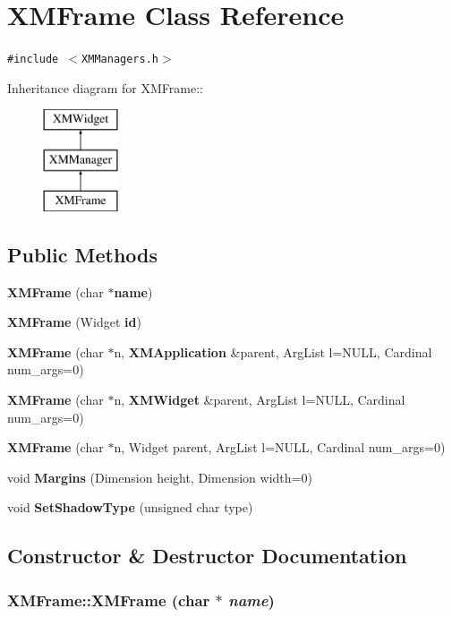 \section{XMFrame  Class Reference}
\label{classXMFrame}
{\tt \#include $<$XMManagers.h$>$}

Inheritance diagram for XMFrame::\begin{figure}[H]
\begin{center}
\leavevmode
\includegraphics[height=3cm]{classXMFrame}
\end{center}
\end{figure}
\subsection*{Public Methods}
\begin{CompactItemize}
\item 
{\bf XMFrame} (char $\ast${\bf name})
\item 
{\bf XMFrame} (Widget {\bf id})
\item 
{\bf XMFrame} (char $\ast$n, {\bf XMApplication} \&parent, Arg\-List l=NULL, Cardinal num\_\-args=0)
\item 
{\bf XMFrame} (char $\ast$n, {\bf XMWidget} \&parent, Arg\-List l=NULL, Cardinal num\_\-args=0)
\item 
{\bf XMFrame} (char $\ast$n, Widget parent, Arg\-List l=NULL, Cardinal num\_\-args=0)
\item 
void {\bf Margins} (Dimension height, Dimension width=0)
\item 
void {\bf Set\-Shadow\-Type} (unsigned char type)
\end{CompactItemize}


\subsection{Constructor \& Destructor Documentation}
\subsubsection{\setlength{\rightskip}{0pt plus 5cm}XMFrame::XMFrame (char $\ast$ {\em name})\hspace{0.3cm}{\tt  [inline]}}\label{classXMFrame_a0}




